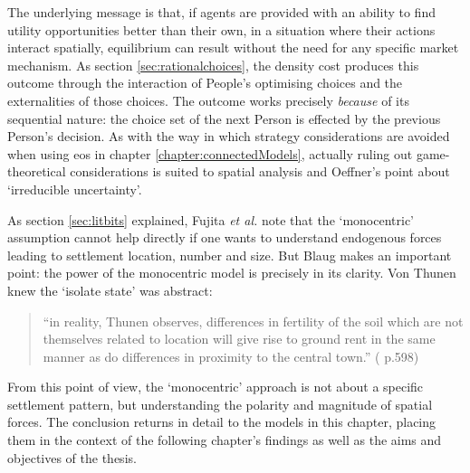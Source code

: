 The underlying message is that, if agents are provided with an ability to find utility opportunities better than their own, in a situation where their actions interact spatially, equilibrium can result without the need for any specific market mechanism. As section \ref{sec:rationalchoices}, the density cost produces this outcome through the interaction of People's optimising choices and the externalities of those choices. The outcome works precisely \emph{because} of its sequential nature: the choice set of the next Person is effected by the previous Person's decision. As with the way in which strategy considerations are avoided when using \gls{eos} in chapter \ref{chapter:connectedModels}, actually ruling out game-theoretical considerations is suited to spatial analysis and Oeffner's point about `irreducible uncertainty'. 

As section \ref{sec:litbits} explained, Fujita \emph{et al.} note that the `monocentric' assumption cannot help directly if one wants to understand endogenous forces leading to settlement location, number and size. But Blaug makes an important point: the power of the monocentric model is precisely in its clarity. Von Thunen knew the `isolate state' was abstract: 

\begin{quote}
``in reality, Thunen observes, differences in fertility of the soil which are not themselves related to location will give rise to ground rent in the same manner as do differences in proximity to the central town.'' (\citealt{blaug_economic_1997} p.598)
\end{quote}

From this point of view, the `monocentric' approach is not about a specific settlement pattern, but understanding the polarity and magnitude of spatial forces. The conclusion returns in detail to the models in this chapter, placing them in the context of the following chapter's findings as well as the aims and objectives of the thesis.

